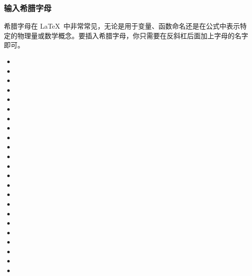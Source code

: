 {\subsubsection{输入希腊字母}
希腊字母在 \LaTeX\ 中非常常见，无论是用于变量、函数命名还是在公式中表示特定的物理量或数学概念。要插入希腊字母，你只需要在反斜杠后面加上字母的名字即可。
\begin{texlst}
\begin{itemize}[nosep]
\item \alpha
\item \beta
\item \gamma\quad\Gamma
\item \delta\quad\Delta
\item \epsilon
\item \zeta
\item \eta
\item \theta\quad\Theta
\item \iota
\item \kappa
\item \lambda\quad\Lambda
\item \mu
\item \nu
\item \xi\quad\Xi
\item \pi\quad\Pi
\item \rho
\item \sigma\quad\Sigma
\item \tau
\item \upsilon\quad\Upsilon
\item \phi\quad\Phi
\item \chi
\item \psi\quad\Psi
\item \omega\quad\Omega
\end{itemize}
\end{texlst}

\pagebreak

}
